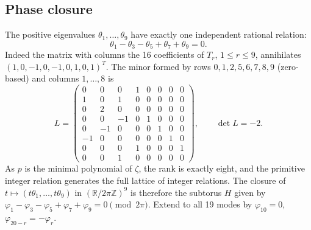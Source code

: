 \documentclass[11pt,a4paper]{article}
\newcommand{\R}{\mathbb R}\newcommand{\Q}{\mathbb Q}\newcommand{\Z}{\mathbb Z}\newcommand{\T}{\mathbb T}
\begin{document}
\subsection{Phase closure}
The positive eigenvalues $\theta_1,\ldots,\theta_9$ have exactly one independent rational relation:
\begin{equation}\label{eq:rel}
\theta_1-\theta_3-\theta_5+\theta_7+\theta_9=0.
\end{equation}
Indeed the matrix with columns the 16 coefficients of $T_r$, $1\le r\le9$, annihilates $(1,0,-1,0,-1,0,1,0,1)^T$. The minor formed by rows $0,1,2,5,6,7,8,9$ (zero-based) and columns $1,\ldots,8$ is
\[
L=\begin{pmatrix}
0&0&0&1&0&0&0&0\\1&0&1&0&0&0&0&0\\0&2&0&0&0&0&0&0\\0&0&-1&0&1&0&0&0\\0&-1&0&0&0&1&0&0\\-1&0&0&0&0&0&1&0\\0&0&0&1&0&0&0&1\\0&0&1&0&0&0&0&0
\end{pmatrix},\qquad \det L=-2.
\]
As $p$ is the minimal polynomial of $\zeta$, the rank is exactly eight, and the primitive integer relation generates the full lattice of integer relations. The closure of $t\mapsto(t\theta_1,\ldots,t\theta_9)$ in $(\R/2\pi\Z)^9$ is therefore the subtorus $H$ given by $\varphi_1-\varphi_3-\varphi_5+\varphi_7+\varphi_9=0\pmod{2\pi}$. Extend to all 19 modes by $\varphi_{10}=0$, $\varphi_{20-r}=-\varphi_r$.
\end{document}
